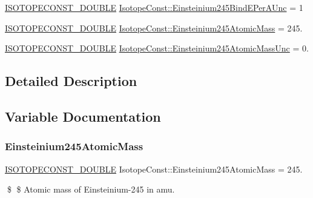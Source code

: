 \begin{DoxyCompactItemize}
\mbox{\hyperlink{group___isotope_const-_macros_ga8f45a7272ce02c0b4c65c44636ed719a}{I\+S\+O\+T\+O\+P\+E\+C\+O\+N\+S\+T\+\_\+\+D\+O\+U\+B\+LE}} \mbox{\hyperlink{group___isotope_const-_einsteinium-_es245_ga23b3673c8332c23a3a7d55ff58aafa43}{Isotope\+Const\+::\+Einsteinium245\+Bind\+E\+Per\+A\+Unc}} = 1
\item 
\mbox{\hyperlink{group___isotope_const-_macros_ga8f45a7272ce02c0b4c65c44636ed719a}{I\+S\+O\+T\+O\+P\+E\+C\+O\+N\+S\+T\+\_\+\+D\+O\+U\+B\+LE}} \mbox{\hyperlink{group___isotope_const-_einsteinium-_es245_ga8d8e8fa1bdab086508ca932a8747494f}{Isotope\+Const\+::\+Einsteinium245\+Atomic\+Mass}} = 245.
\item 
\mbox{\hyperlink{group___isotope_const-_macros_ga8f45a7272ce02c0b4c65c44636ed719a}{I\+S\+O\+T\+O\+P\+E\+C\+O\+N\+S\+T\+\_\+\+D\+O\+U\+B\+LE}} \mbox{\hyperlink{group___isotope_const-_einsteinium-_es245_gaa9c217d054a501f6fa2283815f39badb}{Isotope\+Const\+::\+Einsteinium245\+Atomic\+Mass\+Unc}} = 0.
\end{DoxyCompactItemize}


\subsection{Detailed Description}


\subsection{Variable Documentation}
\mbox{\label{group___isotope_const-_einsteinium-_es245_ga8d8e8fa1bdab086508ca932a8747494f}} 
\subsubsection{\texorpdfstring{Einsteinium245\+Atomic\+Mass}{Einsteinium245AtomicMass}}
{\footnotesize\ttfamily \mbox{\hyperlink{group___isotope_const-_macros_ga8f45a7272ce02c0b4c65c44636ed719a}{I\+S\+O\+T\+O\+P\+E\+C\+O\+N\+S\+T\+\_\+\+D\+O\+U\+B\+LE}} Isotope\+Const\+::\+Einsteinium245\+Atomic\+Mass = 245.}

\$ \$ Atomic mass of Einsteinium-\/245 in amu. \mbox{\label{group___isotope_const-_einsteinium-_es245_gaa9c217d054a501f6fa2283815f39badb}} 
